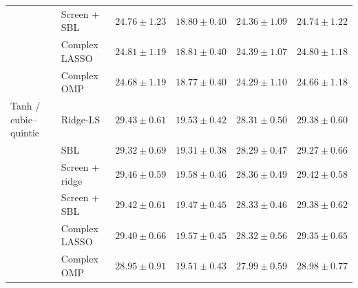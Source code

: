 \begin{table}[!t]
\begin{tabular}{llrrrr}
 & Screen + SBL & $24.76\pm1.23$ & $18.80\pm0.40$ & $24.36\pm1.09$ & $24.74\pm1.22$\\

 & Complex LASSO & $24.81\pm1.19$ & $18.81\pm0.40$ & $24.39\pm1.07$ & $24.80\pm1.18$\\

 & Complex OMP & $24.68\pm1.19$ & $18.77\pm0.40$ & $24.29\pm1.10$ & $24.66\pm1.18$\\

\midrule

Tanh / cubic--quintic & Ridge-LS & $29.43\pm0.61$ & $19.53\pm0.42$ & $28.31\pm0.50$ & $29.38\pm0.60$\\

 & SBL & $29.32\pm0.69$ & $19.31\pm0.38$ & $28.29\pm0.47$ & $29.27\pm0.66$\\

 & Screen + ridge & $29.46\pm0.59$ & $19.58\pm0.46$ & $28.36\pm0.49$ & $29.42\pm0.58$\\

 & Screen + SBL & $29.42\pm0.61$ & $19.47\pm0.45$ & $28.33\pm0.46$ & $29.38\pm0.62$\\

 & Complex LASSO & $29.40\pm0.66$ & $19.57\pm0.45$ & $28.32\pm0.56$ & $29.35\pm0.65$\\

 & Complex OMP & $28.95\pm0.91$ & $19.51\pm0.43$ & $27.99\pm0.59$ & $28.98\pm0.77$\\

\bottomrule\end{tabular}\end{table}

